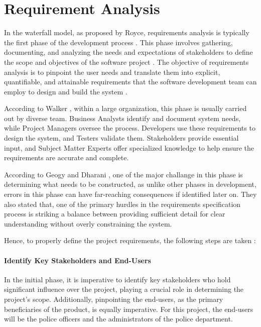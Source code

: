 \chapter{Requirement Analysis}
\label{chapter:requirement-analysis}

In the waterfall model, as proposed by Royce, requirements analysis is typically the first phase of the development process \cite{royce70}. This phase involves gathering, documenting, and analyzing the needs and expectations of stakeholders to define the scope and objectives of the software project \cite{Hausen}. The objective of requirements analysis is to pinpoint the user needs and translate them into explicit, quantifiable, and attainable requirements that the software development team can employ to design and build the system \cite{Walker_2023}.

According to Walker \cite{Walker_2023}, within a large organization, this phase is usually carried out by diverse team. Business Analysts identify and document system needs, while Project Managers oversee the process. Developers use these requirements to design the system, and Testers validate them. Stakeholders provide essential input, and Subject Matter Experts offer specialized knowledge to help ensure the requirements are accurate and complete.

According to Geogy and Dharani \cite{Geogy2016}, one of the major challange in this phase is determining what needs to be constructed, as unlike other phases in development, errors in this phase can have far-reaching consequences if identified later on. They also stated that, one of the primary hurdles in the requirements specification process is striking a balance between providing sufficient detail for clear understanding without overly constraining the system.

Hence, to properly define the project requirements, the following steps are taken \cite{Simplilearn_2023}:

\subsubsection{Identify Key Stakeholders and End-Users}
In the initial phase, it is imperative to identify key stakeholders who hold significant influence over the project, playing a crucial role in determining the project's scope. Additionally, pinpointing the end-users, as the primary beneficiaries of the product, is equally imperative. For this project, the end-users will be the police officers and the administrators of the police department.

